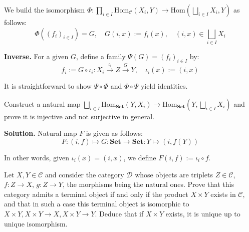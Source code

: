 \documentclass{category-template}
\begin{document}
We build the isomorphism $\Phi: \prod_{i \in I}\text{Hom}_{\mathcal{C}}(X_i,
Y) \to \text{Hom}\left(\bigsqcup_{i \in I} X_i, Y\right)$ as follows:
\begin{equation*}
    \Phi((f_i)_{i \in I}) = G, \quad G(i,x) := f_i(x), \quad (i, x) \in \bigsqcup_{i \in I} X_i
\end{equation*}

\textbf{Inverse.} For a given $G$, define a family $\Psi(G) = (f_i)_{i \in I}$
by:
\begin{equation*}
    f_i := G \circ \iota_i: X_i \xrightarrow{\iota_i} Z \xrightarrow{G} Y, \quad 
    \iota_i(x) := (i, x)
\end{equation*}

It is straightforward to show $\Psi \circ \Phi$ and $\Phi \circ \Psi$ yield
identities.

\begin{problem}
    Construct a natural map $\bigsqcup_{i \in I} \text{Hom}_{\textbf{Set}}(Y,X_i) \to
    \text{Hom}_{\textbf{Set}}(Y,\bigsqcup_{i \in I}X_i)$ and prove it is injective and
    not surjective in general.
\end{problem}

\textbf{Solution.} Natural map $F$ is given as follows:
\begin{equation*}
    F: (i,f) \mapsto G: \textbf{Set} \to \textbf{Set}: Y \mapsto (i,f(Y))
\end{equation*}

In other words, given $\iota_i(x) = (i,x)$, we define $F(i,f) := \iota_i \circ
f$.

\begin{problem}
    Let $X,Y \in \mathcal{C}$ and consider the category $\mathcal{D}$ whose
    objects are triplets $Z \in \mathcal{C}$, $f: Z \to X$, $g: Z \to Y$, the
    morphisms being the natural ones. Prove that this category admits a terminal
    object if and only if the product $X \times Y$ exists in $\mathcal{C}$, and
    that in such a case this terminal object is isomorphic to $X \times Y, X
    \times Y \to X, X \times Y \to Y$. Deduce that if $X \times Y$ exists, it is
    unique up to unique isomorphism.
\end{problem}
\end{document}
